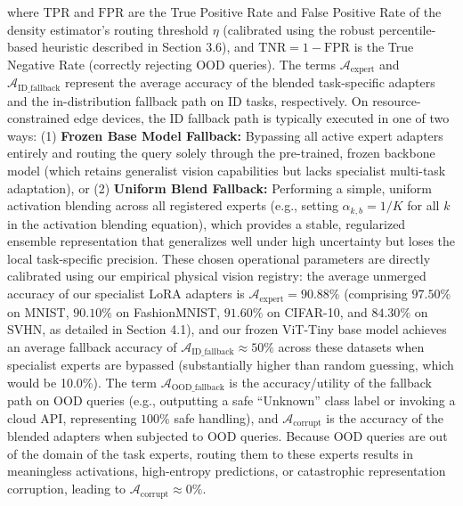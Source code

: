 where $\text{TPR}$ and $\text{FPR}$ are the True Positive Rate and False Positive Rate of the density estimator's routing threshold $\eta$ (calibrated using the robust percentile-based heuristic described in Section 3.6), and $\text{TNR} = 1 - \text{FPR}$ is the True Negative Rate (correctly rejecting OOD queries). The terms $\mathcal{A}_{\text{expert}}$ and $\mathcal{A}_{\text{ID\_fallback}}$ represent the average accuracy of the blended task-specific adapters and the in-distribution fallback path on ID tasks, respectively. On resource-constrained edge devices, the ID fallback path is typically executed in one of two ways: (1) {\bf Frozen Base Model Fallback:} Bypassing all active expert adapters entirely and routing the query solely through the pre-trained, frozen backbone model (which retains generalist vision capabilities but lacks specialist multi-task adaptation), or (2) {\bf Uniform Blend Fallback:} Performing a simple, uniform activation blending across all registered experts (e.g., setting $\alpha_{k, b} = 1/K$ for all $k$ in the activation blending equation), which provides a stable, regularized ensemble representation that generalizes well under high uncertainty but loses the local task-specific precision. These chosen operational parameters are directly calibrated using our empirical physical vision registry: the average unmerged accuracy of our specialist LoRA adapters is $\mathcal{A}_{\text{expert}} = 90.88\%$ (comprising $97.50\%$ on MNIST, $90.10\%$ on FashionMNIST, $91.60\%$ on CIFAR-10, and $84.30\%$ on SVHN, as detailed in Section 4.1), and our frozen ViT-Tiny base model achieves an average fallback accuracy of $\mathcal{A}_{\text{ID\_fallback}} \approx 50\%$ across these datasets when specialist experts are bypassed (substantially higher than random guessing, which would be 10.0\%). The term $\mathcal{A}_{\text{OOD\_fallback}}$ is the accuracy/utility of the fallback path on OOD queries (e.g., outputting a safe ``Unknown'' class label or invoking a cloud API, representing $100\%$ safe handling), and $\mathcal{A}_{\text{corrupt}}$ is the accuracy of the blended adapters when subjected to OOD queries. Because OOD queries are out of the domain of the task experts, routing them to these experts results in meaningless activations, high-entropy predictions, or catastrophic representation corruption, leading to $\mathcal{A}_{\text{corrupt}} \approx 0\%$.

